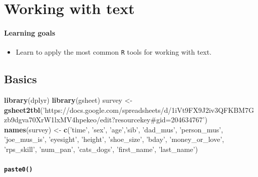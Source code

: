 \documentclass[
]{book}
\newenvironment{Shaded}{\begin{snugshade}}{\end{snugshade}}
\newcommand{\KeywordTok}[1]{\textcolor[rgb]{0.13,0.29,0.53}{\textbf{#1}}}
\newcommand{\NormalTok}[1]{#1}
\newcommand{\StringTok}[1]{\textcolor[rgb]{0.31,0.60,0.02}{#1}}
\providecommand{\tightlist}{%
  \setlength{\itemsep}{0pt}\setlength{\parskip}{0pt}}
\begin{document}
\hypertarget{text}{%
\chapter{Working with text}\label{text}}

\hypertarget{learning-goals-21}{%
\subsubsection*{Learning goals}\label{learning-goals-21}}

\begin{itemize}
\tightlist
\item
  Learn to apply the most common \texttt{R} tools for working with text.
\end{itemize}

\hypertarget{basics}{%
\section*{Basics}\label{basics}}

\begin{Shaded}
\begin{Highlighting}[]
\KeywordTok{library}\NormalTok{(dplyr)}
\KeywordTok{library}\NormalTok{(gsheet)}
\NormalTok{survey <-}\StringTok{ }\KeywordTok{gsheet2tbl}\NormalTok{(}\StringTok{'https://docs.google.com/spreadsheets/d/1iVt9FX9J2iv3QFKBM7Gzb9dgva70XrW1lxMV4hpekeo/edit?resourcekey#gid=204634767'}\NormalTok{)}
\KeywordTok{names}\NormalTok{(survey) <-}\StringTok{ }\KeywordTok{c}\NormalTok{(}\StringTok{'time'}\NormalTok{, }\StringTok{'sex'}\NormalTok{, }\StringTok{'age'}\NormalTok{,}\StringTok{'sib'}\NormalTok{, }\StringTok{'dad_mus'}\NormalTok{, }\StringTok{'person_mus'}\NormalTok{, }\StringTok{'joe_mus_is'}\NormalTok{, }\StringTok{'eyesight'}\NormalTok{, }\StringTok{'height'}\NormalTok{, }\StringTok{'shoe_size'}\NormalTok{, }\StringTok{'bday'}\NormalTok{, }\StringTok{'money_or_love'}\NormalTok{, }\StringTok{'rps_skill'}\NormalTok{, }\StringTok{'num_pan'}\NormalTok{, }\StringTok{'cats_dogs'}\NormalTok{, }\StringTok{'first_name'}\NormalTok{, }\StringTok{'last_name'}\NormalTok{)}
\end{Highlighting}
\end{Shaded}

\hypertarget{paste0}{%
\subsubsection*{\texorpdfstring{\texttt{paste0()}}{paste0()}}\label{paste0}}
\end{document}

